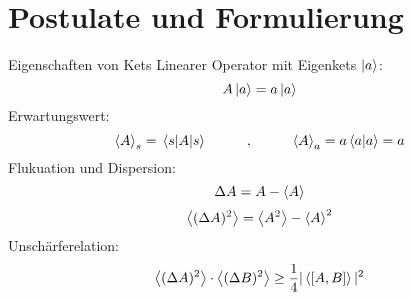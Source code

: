\section{Postulate und Formulierung}

\begin{mainbox}{Eigenschaften von Kets}
Linearer Operator mit Eigenkets $\ket{a}$:
 \[ A \ket{a} = a \ket{a} \]
Erwartungswert:
 \[ \expval{A}_s = \mel{s}{A}{s} \hspace*{1cm}, \hspace{1cm} \expval{A}_a = a \braket{a}{a} = a \]
Flukuation und Dispersion:
\[ \Delta A = A - \expval{A} \]
\[ \expval{(\Delta A)^2} = \expval{A^2} - \expval{A}^2 \]
Unschärferelation:
\[ \expval{(\Delta A)^2}\cdot \expval{(\Delta B)^2} \geq \frac{1}{4} | \expval{\comm{A}{B}}|^2 \]
\end{mainbox}

